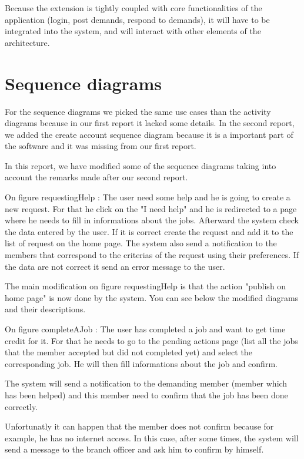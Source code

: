 \documentclass[11pt, a4paper]{article}   	%
\begin{document}
\medskip
Because the extension is tightly coupled with core functionalities of the application (login, post demands, respond to demands), it will have to be integrated into the system, and will interact with other elements of the architecture.




\section{Sequence diagrams}

For the sequence diagrams we picked the same use cases than the activity diagrams because in our first report it lacked some details.
In the second report, we added the create account sequence diagram because it is a important part of the software and it was missing from our first report.

In this report, we have modified some of the sequence diagrams taking into account the remarks made after our second report.


On figure {requestingHelp} : The user need some help and he is going to create a new request. For that he click on the "I need help"
and he is redirected to a page where he needs to fill in informations about the jobs. Afterward the system check the data entered by the user.
If it is correct create the request and add it to the list of request on the home page. The system also send a notification to the members that
correspond to the criterias of the request using their preferences. If the data are not correct it send an error message to the user.

The main modification on figure {requestingHelp} is that the action "publish on home page" is now done by the system. You can see below the modified 
diagrams and their descriptions.


On figure {completeAJob} : The user has completed a job and want to get time credit for it. For that he needs to go to the pending actions page (list all the jobs that the member accepted but did not completed yet) and select the corresponding job. He will then fill informations about the job and confirm. 

The system will send a notification to the demanding member (member which has been helped) and this member need to confirm that the job has been done correctly.

Unfortunatly it can happen that the member does not confirm because for example, he has no internet access. In this case, after some times, the system will send a message to the branch officer and ask him to confirm by himself.
\end{document}
